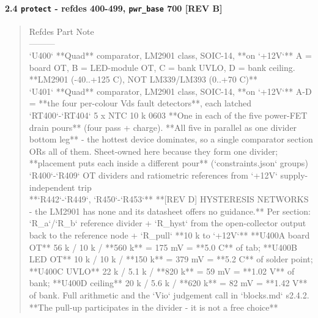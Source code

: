 \documentclass[11pt,a4paper]{article}
\begin{document}
\paragraph*{2.4 \texttt{protect} - refdes 400-499, \texttt{pwr\_base} 700  \textbf{{[}REV B{]}}}
\begin{quote}\small\ttfamily\raggedright
\textbar{} Refdes \textbar{} Part \textbar{} Note \textbar{}\\
\textbar{}---\textbar{}---\textbar{}---\textbar{}\\
\textbar{} `U400` \textbar{} {*}{*}Quad{*}{*} comparator, LM2901 class, SOIC-14, {*}{*}on `+12V`{*}{*} \textbar{} A = board OT, B = LED-module OT, C = bank UVLO, D = bank ceiling. {*}{*}LM2901 (-40..+125 C), NOT LM339/LM393 (0..+70 C){*}{*} \textbar{}\\
\textbar{} `U401` \textbar{} {*}{*}Quad{*}{*} comparator, LM2901 class, SOIC-14, {*}{*}on `+12V`{*}{*} \textbar{} A-D = {*}{*}the four per-colour Vds fault detectors{*}{*}, each latched \textbar{}\\
\textbar{} `RT400`-`RT404` \textbar{} 5 x NTC 10 k 0603 \textbar{} {*}{*}One in each of the five power-FET drain pours{*}{*} (four pass + charge). {*}{*}All five in parallel as one divider bottom leg{*}{*} - the hottest device dominates, so a single comparator section ORs all of them. Sheet-owned here because they form one divider; {*}{*}placement puts each inside a different pour{*}{*} (`constraints.json` groups) \textbar{}\\
\textbar{} `R400`-`R409` \textbar{} OT dividers and ratiometric references from `+12V` \textbar{} supply-independent trip \textbar{}\\
\textbar{} {*}{*}`R442`-`R449`, `R450`-`R453`{*}{*} \textbar{} {*}{*}{[}REV D{]} HYSTERESIS NETWORKS - the LM2901 has none and its datasheet offers no guidance.{*}{*} Per section: `R\_a`/`R\_b` reference divider + `R\_hyst` from the open-collector output back to the reference node + `R\_pull` {*}{*}10 k to `+12V`{*}{*} \textbar{} {*}{*}U400A board OT{*}{*} 56 k / 10 k / {*}{*}560 k{*}{*} = 175 mV = {*}{*}5.0 C{*}{*} of tab; {*}{*}U400B LED OT{*}{*} 10 k / 10 k / {*}{*}150 k{*}{*} = 379 mV = {*}{*}5.2 C{*}{*} of solder point; {*}{*}U400C UVLO{*}{*} 22 k / 5.1 k / {*}{*}820 k{*}{*} = 59 mV = {*}{*}1.02 V{*}{*} of bank; {*}{*}U400D ceiling{*}{*} 20 k / 5.6 k / {*}{*}620 k{*}{*} = 82 mV = {*}{*}1.42 V{*}{*} of bank. Full arithmetic and the `Vio` judgement call in `blocks.md` s2.4.2. {*}{*}The pull-up participates in the divider - it is not a free choice{*}{*} \textbar{}\\

\end{quote}
\end{document}
